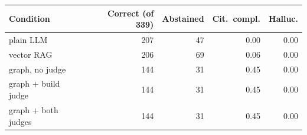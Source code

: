 \begin{tabular}{lrrrr}
\toprule
Condition & Correct (of 339) & Abstained & Cit.\ compl. & Halluc. \\
\midrule
plain LLM & 207 & 47 & 0.00 & 0.00 \\
vector RAG & 206 & 69 & 0.06 & 0.00 \\
graph, no judge & 144 & 31 & 0.45 & 0.00 \\
graph + build judge & 144 & 31 & 0.45 & 0.00 \\
graph + both judges & 144 & 31 & 0.45 & 0.00 \\
\bottomrule
\end{tabular}
